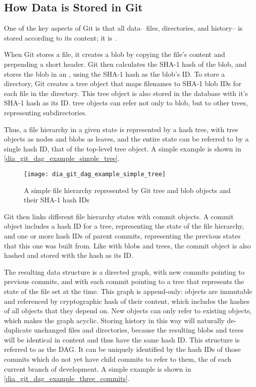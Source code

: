 %


\subsection{How Data is Stored in Git}

One of the key aspects of Git is that all data-- files, directories, and
history-- is stored according to its content; it is .

When Git stores a file, it creates a \gls{blob} by copying the file's content
and prepending a short header. Git then calculates the SHA-1 hash of the
\gls{blob}, and stores the \gls{blob} in an , using the
SHA-1 hash as the \gls{blob}'s ID. To store a directory, Git creates a
\gls{tree} object that maps filenames to SHA-1 \gls{blob} IDs for each file
in the directory. This \gls{tree} object is also stored in the database with it's
SHA-1 hash as its ID. \Gls{tree} objects can refer not only to \gls{blob}, but to
other \glspl{tree}, representing subdirectories.

Thus, a file hierarchy in a given state is represented by a hash tree, with
\gls{tree} objects as nodes and \glspl{blob} as leaves, and the entire state can
be referred to by a single hash ID, that of the top-level \gls{tree} object. A
simple example is shown in \autoref{dia_git_dag_example_simple_tree}.

\begin{figure}[h]
    \centering
    \texttt{[image: dia\_git\_dag\_example\_simple\_tree]}
    \caption{A simple file hierarchy represented by Git tree and blob objects
    and their SHA-1 hash IDs}
    \label{dia_git_dag_example_simple_tree}
\end{figure}

Git then links different file hierarchy states with \gls{commit} objects. A
\gls{commit} object includes a hash ID for a \gls{tree}, representing the state
of the file hierarchy, and one or more hash IDs of parent \glspl{commit},
representing the previous states that this one was built from. Like with
\glspl{blob} and \glspl{tree}, the \gls{commit} object is also hashed and stored
with the hash as its ID.

The resulting data structure is a directed graph, with new \glspl{commit}
pointing to previous \glspl{commit}, and with each \gls{commit} pointing to a
\gls{tree} that represents the state of the file set at the time. This graph is
append-only: objects are immutable and referenced by cryptographic hash of their
content, which includes the hashes of all objects that they depend on. New
objects can only refer to existing objects, which makes the graph acyclic.
Storing history in this way will naturally de-duplicate unchanged files and
directories, because the resulting \glspl{blob} and \glspl{tree} will be
identical in content and thus have the same hash ID. This
 structure is referred to as the
\acrshort{DAG}. It can be uniquely identified by the hash IDs of
those \glspl{commit} which do not yet have child \glspl{commit} to refer to
them, the  of each current branch of development. A simple
example is shown in \autoref{dia_git_dag_example_three_commits}.

